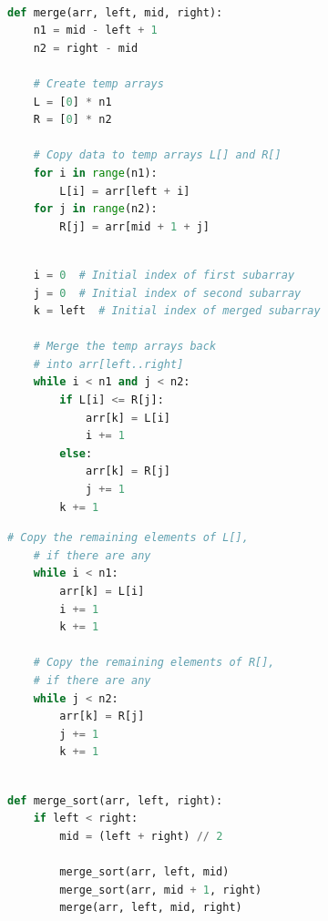 \documentclass[aspectratio=1610]{beamer}
\begin{document}
\begin{frame}[fragile]
\begin{lstlisting}[language=Python]

def merge(arr, left, mid, right):
    n1 = mid - left + 1
    n2 = right - mid

    # Create temp arrays
    L = [0] * n1
    R = [0] * n2

    # Copy data to temp arrays L[] and R[]
    for i in range(n1):
        L[i] = arr[left + i]
    for j in range(n2):
        R[j] = arr[mid + 1 + j]

\end{lstlisting}
\end{frame}


\begin{frame}[fragile]
\begin{lstlisting}[language=Python]

    i = 0  # Initial index of first subarray
    j = 0  # Initial index of second subarray
    k = left  # Initial index of merged subarray

    # Merge the temp arrays back
    # into arr[left..right]
    while i < n1 and j < n2:
        if L[i] <= R[j]:
            arr[k] = L[i]
            i += 1
        else:
            arr[k] = R[j]
            j += 1
        k += 1

\end{lstlisting}
\end{frame}



\begin{frame}[fragile]
\begin{lstlisting}[language=Python]
   # Copy the remaining elements of L[],
    # if there are any
    while i < n1:
        arr[k] = L[i]
        i += 1
        k += 1

    # Copy the remaining elements of R[], 
    # if there are any
    while j < n2:
        arr[k] = R[j]
        j += 1
        k += 1

\end{lstlisting}
\end{frame}


\begin{frame}[fragile]
\begin{lstlisting}[language=Python]

def merge_sort(arr, left, right):
    if left < right:
        mid = (left + right) // 2

        merge_sort(arr, left, mid)
        merge_sort(arr, mid + 1, right)
        merge(arr, left, mid, right)

\end{lstlisting}
\end{frame}
\end{document}
